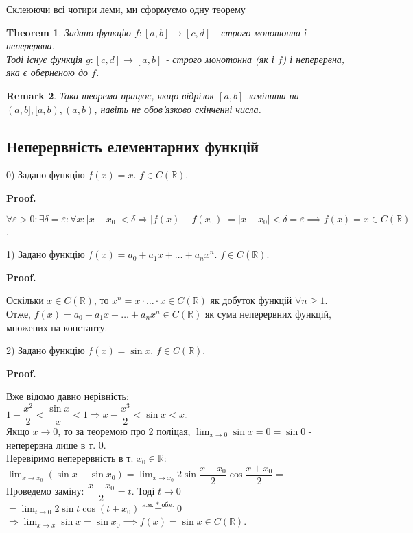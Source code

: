 \documentclass[a4paper, 14pt]{article}
\makeatletter
\def\qed{$\blacksquare$}
\theoremstyle{theoremdd}
\newtheorem{theorem}{Theorem}[subsection]
\theoremstyle{theoremdd}
\theoremstyle{theoremdd}
\theoremstyle{theoremdd}
\theoremstyle{theoremdd}
\theoremstyle{theoremdd}
\newtheorem{remark}[theorem]{Remark}
\theoremstyle{theoremdd}
\theoremstyle{theoremdd}
\renewenvironment{proof}[1][Proof.\\]{\par
\pushQED{\hfill \qed}%
\normalfont \topsep6\p@\@plus6\p@\relax
\trivlist
\item\relax
{\bfseries
#1\@addpunct{.}}\hspace\labelsep\ignorespaces
}{%
\popQED\endtrivlist\@endpefalse
}
\makeatother
\begin{document}
Склеюючи всі чотири леми, ми сформуємо одну теорему

\begin{theorem}
Задано функцію $f: [a,b] \to [c,d]$ - строго монотонна і неперервна.\\
Тоді існує функція $g: [c,d] \to [a,b]$ - строго монотонна (як і $f$) і неперервна, яка є оберненою до $f$.
\end{theorem}

\begin{remark}
Така теорема працює, якщо відрізок $[a,b]$ замінити на $(a,b],[a,b),(a,b)$, навіть не обов'язково скінченні числа.
\end{remark}

\subsection{Неперервність елементарних функцій}
0) Задано функцію $f(x) = x$.  $f \in C(\mathbb{R})$.
\begin{proof}
$\forall \varepsilon > 0: \exists \delta = \varepsilon: \forall x: |x-x_0|<\delta \Rightarrow |f(x)-f(x_0)| = |x-x_0|<\delta = \varepsilon \implies f(x) = x \in C(\mathbb{R})$.
\end{proof}

1) Задано функцію $f(x) = a_0 + a_1 x + \dots + a_n x^n$.  $f \in C(\mathbb{R})$.
\begin{proof}
Оскільки $x \in C(\mathbb{R})$, то $x^n = x \cdot \dots \cdot x \in C(\mathbb{R})$ як добуток функцій $\forall n \geq 1$.\\
Отже, $f(x) = a_0 + a_1 x + \dots + a_n x^n \in C(\mathbb{R})$ як сума неперервних функцій, множених на константу.
\end{proof}

2) Задано функцію $f(x) = \sin x$. $f \in C(\mathbb{R})$.
\begin{proof}
Вже відомо давно нерівність:\\
$1 - \dfrac{x^2}{2} < \dfrac{\sin x}{x} < 1 \Rightarrow x - \dfrac{x^3}{2} < \sin x < x$.\\
Якщо $x \to 0$, то за теоремою про 2 поліцая, $\displaystyle \lim_{x \to 0} \sin x = 0 = \sin 0$ - неперервна лише в т. $0$.\\
Перевіримо неперервність в т. $x_0 \in \mathbb{R}$:\\
$\displaystyle \lim_{x \to x_0} (\sin x - \sin x_0) = \lim_{x \to x_0} 2 \sin \dfrac{x-x_0}{2} \cos \dfrac{x+x_0}{2} \boxed{=} $\\
Проведемо заміну: $\dfrac{x-x_0}{2} = t$. Тоді $t \to 0$\\
$\boxed{=} \displaystyle \lim_{t \to 0} 2 \sin t \cos (t+x_0) \overset{\text{н.м. * обм.}}{=} 0$
$\Rightarrow \displaystyle \lim_{x \to x} \sin x = \sin x_0 \implies f(x) = \sin x \in C(\mathbb{R})$.
\end{proof}
\end{document}
